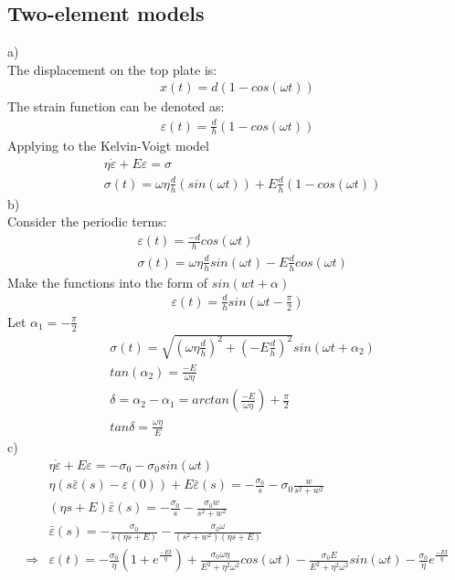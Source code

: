 \documentclass{elsarticle}
\begin{document}
\subsection{Two-element models}
a)\\
The displacement on the top plate is:
\begin{align*}
    x(t) = d(1-cos(\omega t))
\end{align*}
The strain function can be denoted as:
\begin{align*}
    \varepsilon(t)=\frac{d}{h}(1-cos(\omega t))
\end{align*}
Applying to the Kelvin-Voigt model
\begin{align*}
    &\eta \dot{\varepsilon}+E\varepsilon=\sigma\\
    &\sigma(t) = \omega \eta \frac{d}{h}(sin(\omega t))+E\frac{d}{h}(1-cos(\omega t))
\end{align*}
b)\\
Consider the periodic terms:
\begin{align*}
    &\varepsilon(t)=\frac{-d}{h}cos(\omega t)\\
    &\sigma (t)=\omega \eta\frac{d}{h}sin(\omega t)-E\frac{d}{h}cos(\omega t)
\end{align*}
Make the functions into the form of $sin(wt+\alpha)$
\begin{align*}
    \varepsilon(t)=\frac{d}{h}sin(\omega t  -\frac{\pi}{2})
\end{align*}
Let $\alpha_1=-\frac{\pi}{2}$
\begin{align*}
    &\sigma (t)=\sqrt{(\omega \eta\frac{d}{h})^2+(-E\frac{d}{h})^2}sin(\omega t+\alpha_2)\\
    &tan(\alpha_2)=\frac{-E}{\omega\eta}\\
    &\delta=\alpha_2-\alpha_1=arctan(\frac{-E}{\omega\eta})+\frac{\pi}{2}\\
    &tan\delta=\frac{\omega\eta}{E}
\end{align*}
c)\\
\begin{align*}
    &\eta\dot{\varepsilon}+E\varepsilon=-\sigma_0-\sigma_0 sin(\omega t)\\
    &\eta(s\bar{\varepsilon}(s)-\varepsilon(0))+E\bar{\varepsilon}(s)=-\frac{\sigma_0}{s}-\sigma_0\frac{w}{s^2+w^2}\\
    &(\eta s+E)\bar{\varepsilon}(s)=-\frac{\sigma_0}{s}-\frac{\sigma_0 w}{s^2+w^2}\\
    &\bar{\varepsilon}(s)=-\frac{\sigma_0}{s(\eta s+E)}-\frac{\sigma_0\omega}{(s^2+w^2)(\eta s+E)}\\
    \Rightarrow&\varepsilon(t)=-\frac{\sigma_0}{\eta}(1+e^{\frac{-Et}{\eta}})+\frac{\sigma_0\omega\eta}{E^2+\eta^2\omega^2}cos(\omega t)-\frac{\sigma_0 E}{E^2+\eta^2\omega^2}sin(\omega t)-\frac{\sigma_0}{\eta}e^\frac{-Et}{\eta}
\end{align*}
\end{document}
